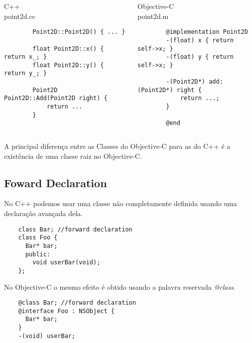 \documentclass[brazil]{beamer}
\begin{document}
\begin{frame}[fragile]
  \begin{columns}
    \begin{column}{.5\textwidth}
      \begin{center}
        C++ \\
        point2d.cc
      \end{center}
      \lstset{language=C++,basicstyle=\tiny}
      \begin{lstlisting}
        Point2D::Point2D() { ... }

        float Point2D::x() { return x_; }
        float Point2D::y() { return y_; }

        Point2D Point2D::Add(Point2D right) {
            return ...
        }
      \end{lstlisting}
    \end{column}
    \begin{column}{.5\textwidth}
      \begin{center}
        Objective-C \\
        point2d.m
      \end{center}
      \lstset{language=C++,basicstyle=\tiny}
      \begin{lstlisting}
        @implementation Point2D
        -(float) x { return self->x; }
        -(float) y { return self->x; }

        -(Point2D*) add: (Point2D*) right {
            return ...;
        }

        @end
      \end{lstlisting}
    \end{column}
  \end{columns}
\end{frame}

\begin{frame}
  A principal diferença entre as Classes do Objective-C para as do C++ é a existência de uma classe
  raiz no Objective-C.
\end{frame}

\subsection{Foward Declaration}

\begin{frame}[fragile]
  No C++ podemos usar uma classe não completamente definida usando uma declaração avançada dela. \\
  \lstset{language=C++,basicstyle=\tiny}
  \begin{lstlisting}
    class Bar; //forward declaration 
    class Foo { 
      Bar* bar; 
      public:
        void userBar(void);
    };
  \end{lstlisting}
  No Objective-C o mesmo efeito é obtido usando a palavra reservada \textit{@class}.
  \lstset{language=C++,basicstyle=\tiny}
  \begin{lstlisting}
    @class Bar; //forward declaration 
    @interface Foo : NSObject { 
      Bar* bar; 
    }
    -(void) userBar;
  \end{lstlisting}
\end{frame}
\end{document}
